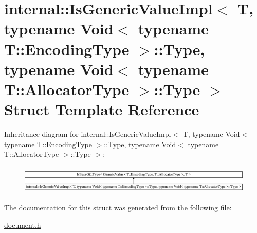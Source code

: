 \hypertarget{a00186}{}\section{internal\+:\+:Is\+Generic\+Value\+Impl$<$ T, typename Void$<$ typename T\+:\+:Encoding\+Type $>$\+:\+:Type, typename Void$<$ typename T\+:\+:Allocator\+Type $>$\+:\+:Type $>$ Struct Template Reference}
\label{a00186}
Inheritance diagram for internal\+:\+:Is\+Generic\+Value\+Impl$<$ T, typename Void$<$ typename T\+:\+:Encoding\+Type $>$\+:\+:Type, typename Void$<$ typename T\+:\+:Allocator\+Type $>$\+:\+:Type $>$\+:\begin{figure}[H]
\begin{center}
\leavevmode
\includegraphics[height=1.372549cm]{a00186}
\end{center}
\end{figure}


The documentation for this struct was generated from the following file\+:\begin{DoxyCompactItemize}
\item 
\hyperlink{a00473}{document.\+h}\end{DoxyCompactItemize}
